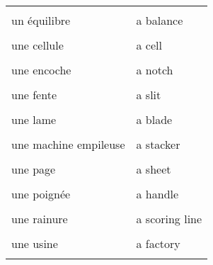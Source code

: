 \documentclass[
  10pt,
]{article}
\begin{document}
\begin{longtable}{ll}
\cellcolor{gray!6}{un écran (m...)} & \cellcolor{gray!6}{a monitor}\\

un équilibre & a balance\\

\cellcolor{gray!6}{une caractéristique, une spécification} & \cellcolor{gray!6}{a feature}\\

une cellule & a cell\\

\cellcolor{gray!6}{une couche} & \cellcolor{gray!6}{a layer}\\

une encoche & a notch\\

\cellcolor{gray!6}{une entreprise} & \cellcolor{gray!6}{a company}\\

une fente & a slit\\

\cellcolor{gray!6}{une forme} & \cellcolor{gray!6}{a shape}\\

une lame & a blade\\

\cellcolor{gray!6}{une livraison} & \cellcolor{gray!6}{a delivery}\\

une machine empileuse & a stacker\\

\cellcolor{gray!6}{une nuance de couleur} & \cellcolor{gray!6}{a hue}\\

une page & a sheet\\

\cellcolor{gray!6}{une plaque} & \cellcolor{gray!6}{a plate}\\

une poignée & a handle\\

\cellcolor{gray!6}{une police (de caractères)} & \cellcolor{gray!6}{a font}\\

une rainure & a scoring line\\

\cellcolor{gray!6}{une récompense, un prix} & \cellcolor{gray!6}{a prize}\\

une usine & a factory\\

\cellcolor{gray!6}{une étape} & \cellcolor{gray!6}{a step}\\


\end{longtable}
\end{document}
